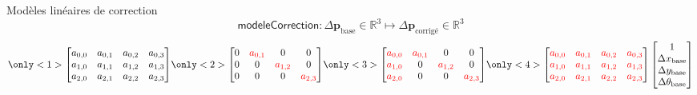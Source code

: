 
\begin{frame}{Modèles linéaires de correction}
    $$
    \mathsf{modeleCorrection} : \Delta \bm{p}_{\text{base}} \in \mathbb{R}^{3} 
    \longmapsto 
    \Delta \bm{p}_{\text{corrigé}} \in \mathbb{R}^{3}
    $$
    \vspace{1em}
    $$
    \only<1>{
        \begin{bmatrix}
            a_{0,0} & a_{0,1} & a_{0,2} & a_{0,3} \\
            a_{1,0} & a_{1,1} & a_{1,2} & a_{1,3} \\
            a_{2,0} & a_{2,1} & a_{2,2} & a_{2,3}
        \end{bmatrix}
    }
    \only<2>{
        \begin{bmatrix}
            0 & \textcolor[rgb]{1,0,0}{a_{0,1}} & 0 & 0 \\
            0 & 0 & \textcolor[rgb]{1,0,0}{a_{1,2}} & 0 \\
            0 & 0 & 0 & \textcolor[rgb]{1,0,0}{a_{2,3}}
        \end{bmatrix}
    }
    \only<3>{
        \begin{bmatrix}
            \textcolor[rgb]{1,0,0}{a_{0,0}} & \textcolor[rgb]{1,0,0}{a_{0,1}} & 0 & 0 \\
            \textcolor[rgb]{1,0,0}{a_{1,0}} & 0 & \textcolor[rgb]{1,0,0}{a_{1,2}} & 0 \\
            \textcolor[rgb]{1,0,0}{a_{2,0}} & 0 & 0 & \textcolor[rgb]{1,0,0}{a_{2,3}}
        \end{bmatrix}
    }
    \only<4>{
        \begin{bmatrix}
            \textcolor[rgb]{1,0,0}{a_{0,0}} & \textcolor[rgb]{1,0,0}{a_{0,1}} & \textcolor[rgb]{1,0,0}{a_{0,2}} & \textcolor[rgb]{1,0,0}{a_{0,3}} \\
            \textcolor[rgb]{1,0,0}{a_{1,0}} & \textcolor[rgb]{1,0,0}{a_{1,1}} & \textcolor[rgb]{1,0,0}{a_{1,2}} & \textcolor[rgb]{1,0,0}{a_{1,3}} \\
            \textcolor[rgb]{1,0,0}{a_{2,0}} & \textcolor[rgb]{1,0,0}{a_{2,1}} & \textcolor[rgb]{1,0,0}{a_{2,2}} & \textcolor[rgb]{1,0,0}{a_{2,3}}
        \end{bmatrix}
    }
    \begin{bmatrix}
        1 \\
        \Delta x_{\text{base}} \\   
        \Delta y_{\text{base}} \\   
        \Delta \theta_{\text{base}}
    \end{bmatrix}
$$
\end{frame}
